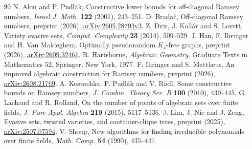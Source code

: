 \documentclass[11pt,a4paper]{article}
\theoremstyle{definition}
\theoremstyle{remark}
\numberwithin{equation}{section}
\begin{document}
\begin{thebibliography}{99}
 N. Alon and P. Pudl\'ak, Constructive lower bounds for off-diagonal Ramsey numbers, \emph{Israel J. Math.} \textbf{122} (2001), 243--251.
 D. Brada\v{c}, Off-diagonal Ramsey numbers, preprint (2026), \href{https://arxiv.org/abs/2605.28793v3}{arXiv:2605.28793v3}.
 Z. Dvir, J. Koll\'ar and S. Lovett, Variety evasive sets, \emph{Comput. Complexity} \textbf{23} (2014), 509--529.
 J. Han, F. Ihringer and H. Van Maldeghem, Optimally pseudorandom $K_4$-free graphs, preprint (2026), \href{https://arxiv.org/abs/2609.32461}{arXiv:2609.32461}.
 R. Hartshorne, \emph{Algebraic Geometry}, Graduate Texts in Mathematics 52, Springer, New York, 1977.
 F. Ihringer and S. Mattheus, An improved algebraic construction for Ramsey numbers, preprint (2026), \href{https://arxiv.org/abs/2608.21769}{arXiv:2608.21769}.
 A. Kostochka, P. Pudl\'ak and V. R\"odl, Some constructive bounds on Ramsey numbers, \emph{J. Combin. Theory Ser. B} \textbf{100} (2010), 439--445.
 G. Lachaud and R. Rolland, On the number of points of algebraic sets over finite fields, \emph{J. Pure Appl. Algebra} \textbf{219} (2015), 5117--5136.
 J. Lim, J. Nie and J. Zeng, Evasive sets, twisted varieties, and container-clique trees, preprint (2025), \href{https://arxiv.org/abs/2507.07594}{arXiv:2507.07594}.
 V. Shoup, New algorithms for finding irreducible polynomials over finite fields, \emph{Math. Comp.} \textbf{54} (1990), 435--447.
\end{thebibliography}
\end{document}
